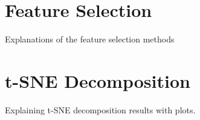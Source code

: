 \section{Feature Selection}
Explanations of the feature selection methods
\section{t-SNE Decomposition}
Explaining t-SNE decomposition results with plots.